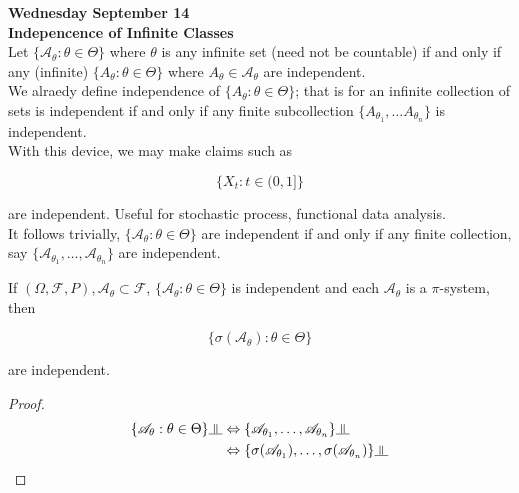 \documentclass[11pt,fleqn]{book} %
\newcommand{\indep}{\rotatebox[origin=c]{90}{$\models$}}
\begin{document}
\textbf{Wednesday September 14}\\

\textbf{Indepencence of Infinite Classes}\\

Let $\{\mathscr{A}_\theta: \theta \in \Theta \}$ where $\theta$ is any infinite set (need not be countable) if and only if any (infinite) $\{A_\theta: \theta \in \Theta \}$ where $A_\theta \in \mathscr{A}_\theta$ are independent. \\

We alraedy define independence of $\{A_\theta: \theta \in \Theta \}$; that is for an infinite collection of sets is independent if and only if any finite subcollection $\{ A_{\theta_1}, \dots A_{\theta_n} \}$ is independent.\\

With this device, we may make claims such as

$$\{X_t: t \in (0,1] \} $$ 

are independent. Useful for stochastic process, functional data analysis.\\

It follows trivially, $\{\mathscr{A}_\theta: \theta \in \Theta \}$ are independent if and only if any finite collection, say $\{\mathscr{A}_{\theta_1}, \dots, \mathscr{A}_{\theta_n} \}$ are independent. 

\begin{corollary}[To Theorem 4.2]
	If $(\Omega, \mathscr{F}, P), \mathscr{A}_\theta \subset \mathscr{F}$,  $\{\mathscr{A}_\theta: \theta \in \Theta \}$ is independent and each $\mathscr{A}_\theta$ is a $\pi$-system, then

	$$\{ \sigma(\mathscr{A}_\theta): \theta \in \Theta \}$$

	are independent. 
\end{corollary}

\begin{proof}
	\begin{align*}
		\{\mathscr{A}_\theta: \theta \in \Theta \} \indep &\Leftrightarrow \{\mathscr{A}_{\theta_1}, \dots, \mathscr{A}_{\theta_n} \} \indep \\
		&\Leftrightarrow \{ \sigma(\mathscr{A}_{\theta_1}), \dots, \sigma(\mathscr{A}_{\theta_n}) \} \indep
	\end{align*}

\end{proof}
\end{document}
